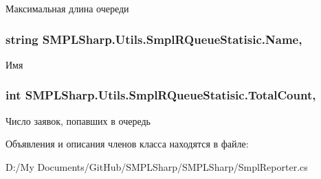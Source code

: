 Максимальная длина очереди 

\hypertarget{class_s_m_p_l_sharp_1_1_utils_1_1_smpl_r_queue_statisic_aaa07c8c4d4ff07e2cb102dcadc700860}{
\subsubsection[{Name}]{\setlength{\rightskip}{0pt plus 5cm}string S\-M\-P\-L\-Sharp.\-Utils.\-Smpl\-R\-Queue\-Statisic.\-Name\hspace{0.3cm}{\ttfamily [get]}, {\ttfamily [set]}}}\label{de/de9/class_s_m_p_l_sharp_1_1_utils_1_1_smpl_r_queue_statisic_aaa07c8c4d4ff07e2cb102dcadc700860}


Имя 

\hypertarget{class_s_m_p_l_sharp_1_1_utils_1_1_smpl_r_queue_statisic_aba57ab69353bec5cd8415a53bd6644fe}{
\subsubsection[{Total\-Count}]{\setlength{\rightskip}{0pt plus 5cm}int S\-M\-P\-L\-Sharp.\-Utils.\-Smpl\-R\-Queue\-Statisic.\-Total\-Count\hspace{0.3cm}{\ttfamily [get]}, {\ttfamily [set]}}}\label{de/de9/class_s_m_p_l_sharp_1_1_utils_1_1_smpl_r_queue_statisic_aba57ab69353bec5cd8415a53bd6644fe}


Число заявок, попавших в очередь 



Объявления и описания членов класса находятся в файле\-:\begin{DoxyCompactItemize}
\item 
D\-:/\-My Documents/\-Git\-Hub/\-S\-M\-P\-L\-Sharp/\-S\-M\-P\-L\-Sharp/Smpl\-Reporter.\-cs\end{DoxyCompactItemize}
